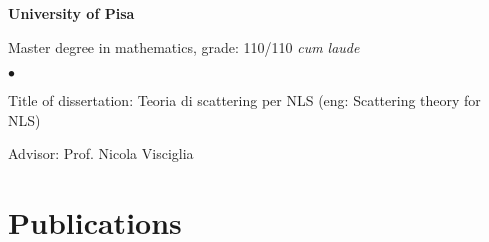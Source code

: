 \documentclass[margin,line,pifont,palatino,courier]{res}
\newenvironment{list1}{
  \begin{list}{\ding{113}}{%
      \setlength{\itemsep}{0in}
      \setlength{\parsep}{0in} \setlength{\parskip}{0in}
      \setlength{\topsep}{0in} \setlength{\partopsep}{0in}
      \setlength{\leftmargin}{0.17in}}}{\end{list}}
\newenvironment{list2}{
  \begin{list}{$\bullet$}{%
      \setlength{\itemsep}{0in}
      \setlength{\parsep}{0in} \setlength{\parskip}{0in}
      \setlength{\topsep}{0in} \setlength{\partopsep}{0in}
      \setlength{\leftmargin}{0.2in}}}{\end{list}}
\begin{document}
\begin{resume}
{\bf University of Pisa}\\
\vspace*{-.2in}
\begin{list1}
\item[] Master degree in mathematics, grade: 110/110 \emph{cum laude}

\begin{list2}
\item Title of dissertation: Teoria di scattering per NLS (eng: Scattering theory for NLS)
\item Advisor: Prof. Nicola Visciglia
\end{list2}

\end{list1}






\section{\sc Publications}


\end{resume}
\end{document}
